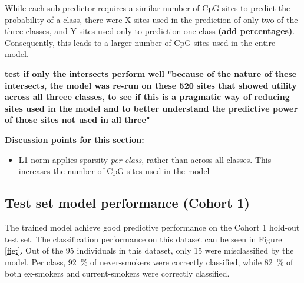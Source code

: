 \documentclass{article}
\begin{document}
While each sub-predictor requires a similar number of CpG sites to predict the probability of a class, there were X sites used in the prediction of only two of the three classes, and Y sites used only to prediction one class \textbf{(add percentages)}. Consequently, this leads to a larger number of CpG sites used in the entire model.

\textbf{test if only the intersects perform well "because of the nature of these intersects, the model was re-run on these 520 sites that showed utility across all threee classes, to see if this is a pragmatic way of reducing sites used in the model and to better understand the predictive power of those sites not used in all three"}


\textbf{Discussion points for this section:}
\begin{itemize}
    \item L1 norm applies sparsity \textit{per class}, rather than across all classes. This increases the number of CpG sites used in the model
\end{itemize}

\subsection{Test set model performance (Cohort 1)} \label{sec:cohort1-performance}
The trained model achieve good predictive performance on the Cohort 1 hold-out test set. The classification performance on this dataset can be seen in Figure \ref{fig:}. Out of the 95 individuals in this dataset, only 15 were misclassified by the model. Per class, \SI{92}{\percent} of never-smokers were correctly classified, while \SI{82}{\percent} of both ex-smokers and current-smokers were correctly classified.
\end{document}
